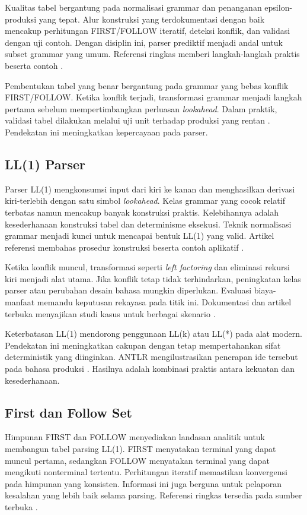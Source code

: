 \documentclass[../main.tex]{subfiles}
\begin{document}
Kualitas tabel bergantung pada normalisasi grammar dan penanganan epsilon-produksi yang tepat. Alur konstruksi yang terdokumentasi dengan baik mencakup perhitungan FIRST/FOLLOW iteratif, deteksi konflik, dan validasi dengan uji contoh. Dengan disiplin ini, parser prediktif menjadi andal untuk subset grammar yang umum. Referensi ringkas memberi langkah-langkah praktis beserta contoh \citep{WikiFirstFollow,WikiPredictiveParser}.

Pembentukan tabel yang benar bergantung pada grammar yang bebas konflik FIRST/FOLLOW. Ketika konflik terjadi, transformasi grammar menjadi langkah pertama sebelum mempertimbangkan perluasan \emph{lookahead}. Dalam praktik, validasi tabel dilakukan melalui uji unit terhadap produksi yang rentan \citep{WikiPredictiveParser}. Pendekatan ini meningkatkan kepercayaan pada parser.

\subsection{LL(1) Parser}
Parser LL(1) mengkonsumsi input dari kiri ke kanan dan menghasilkan derivasi kiri-terlebih dengan satu simbol \emph{lookahead}. Kelas grammar yang cocok relatif terbatas namun mencakup banyak konstruksi praktis. Kelebihannya adalah kesederhanaan konstruksi tabel dan determinisme eksekusi. Teknik normalisasi grammar menjadi kunci untuk mencapai bentuk LL(1) yang valid. Artikel referensi membahas prosedur konstruksi beserta contoh aplikatif \citep{WikiLL}.

Ketika konflik muncul, transformasi seperti \emph{left factoring} dan eliminasi rekursi kiri menjadi alat utama. Jika konflik tetap tidak terhindarkan, peningkatan kelas parser atau perubahan desain bahasa mungkin diperlukan. Evaluasi biaya-manfaat memandu keputusan rekayasa pada titik ini. Dokumentasi dan artikel terbuka menyajikan studi kasus untuk berbagai skenario \citep{WikiLL,CS143}.

Keterbatasan LL(1) mendorong penggunaan LL(k) atau LL(*) pada alat modern. Pendekatan ini meningkatkan cakupan dengan tetap mempertahankan sifat deterministik yang diinginkan. ANTLR mengilustrasikan penerapan ide tersebut pada bahasa produksi \citep{ANTLRDocs}. Hasilnya adalah kombinasi praktis antara kekuatan dan kesederhanaan.

\subsection{First dan Follow Set}
Himpunan FIRST dan FOLLOW menyediakan landasan analitik untuk membangun tabel parsing LL(1). FIRST menyatakan terminal yang dapat muncul pertama, sedangkan FOLLOW menyatakan terminal yang dapat mengikuti nonterminal tertentu. Perhitungan iteratif memastikan konvergensi pada himpunan yang konsisten. Informasi ini juga berguna untuk pelaporan kesalahan yang lebih baik selama parsing. Referensi ringkas tersedia pada sumber terbuka \citep{WikiFirstFollow}.
\end{document}
